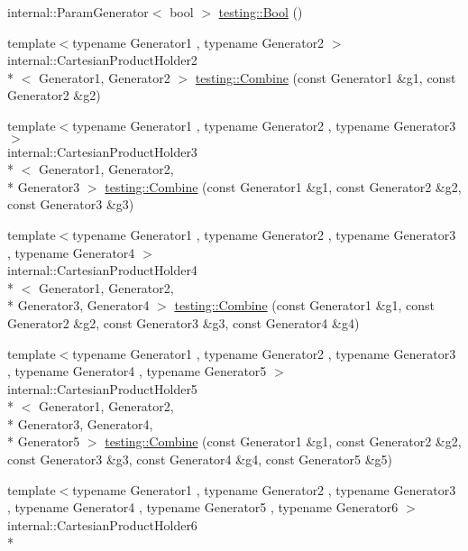 \begin{DoxyCompactItemize}
\item 
internal\-::\-Param\-Generator$<$ bool $>$ \hyperlink{namespacetesting_aa9f9150ed43f949c8a6bacf3f04c03ce}{testing\-::\-Bool} ()
\item 
{\footnotesize template$<$typename Generator1 , typename Generator2 $>$ }\\internal\-::\-Cartesian\-Product\-Holder2\\*
$<$ Generator1, Generator2 $>$ \hyperlink{namespacetesting_a4917922963bacef3e301e67366c41df3}{testing\-::\-Combine} (const Generator1 \&g1, const Generator2 \&g2)
\item 
{\footnotesize template$<$typename Generator1 , typename Generator2 , typename Generator3 $>$ }\\internal\-::\-Cartesian\-Product\-Holder3\\*
$<$ Generator1, Generator2, \\*
Generator3 $>$ \hyperlink{namespacetesting_a77b89180fd846e275236409d9704eda2}{testing\-::\-Combine} (const Generator1 \&g1, const Generator2 \&g2, const Generator3 \&g3)
\item 
{\footnotesize template$<$typename Generator1 , typename Generator2 , typename Generator3 , typename Generator4 $>$ }\\internal\-::\-Cartesian\-Product\-Holder4\\*
$<$ Generator1, Generator2, \\*
Generator3, Generator4 $>$ \hyperlink{namespacetesting_abf420810fcd8190a98c2927862805a3f}{testing\-::\-Combine} (const Generator1 \&g1, const Generator2 \&g2, const Generator3 \&g3, const Generator4 \&g4)
\item 
{\footnotesize template$<$typename Generator1 , typename Generator2 , typename Generator3 , typename Generator4 , typename Generator5 $>$ }\\internal\-::\-Cartesian\-Product\-Holder5\\*
$<$ Generator1, Generator2, \\*
Generator3, Generator4, \\*
Generator5 $>$ \hyperlink{namespacetesting_a81505186d64f5b5763a0e268bc2e5650}{testing\-::\-Combine} (const Generator1 \&g1, const Generator2 \&g2, const Generator3 \&g3, const Generator4 \&g4, const Generator5 \&g5)
\item 
{\footnotesize template$<$typename Generator1 , typename Generator2 , typename Generator3 , typename Generator4 , typename Generator5 , typename Generator6 $>$ }\\internal\-::\-Cartesian\-Product\-Holder6\\*

\end{DoxyCompactItemize}
